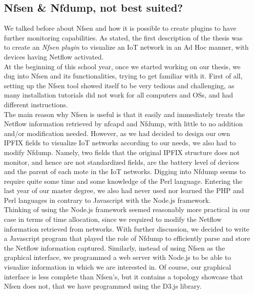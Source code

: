 \subsection{Nfsen \& Nfdump, not best suited?}

We talked before about Nfsen and how it is possible to create plugins to have further monitoring capabilities. As stated, the first description of the thesis was to create an \textit{Nfsen plugin} to visualize an IoT network in an Ad Hoc manner, with devices having Netflow activated.\\

At the beginning of this school year, once we started working on our thesis, we dug into Nfsen and its functionalities, trying to get familiar with it. First of all, setting up the Nfsen tool showed itself to be very tedious and challenging, as many installation tutorials did not work for all computers and OSs, and had different instructions.\\

The main reason why Nfsen is useful is that it easily and immediately treats the Netflow information retrieved by nfcapd and Nfdump, with little to no addition and/or modification needed. However, as we had decided to design our own IPFIX fields to visualize IoT networks according to our needs, we also had to modify Nfdump. Namely, two fields that the original IPFIX structure does not monitor, and hence are not standardized fields, are the battery level of devices and the parent of each mote in the IoT networks. Digging into Nfdump seems to require quite some time and some knowledge of the Perl language. Entering the last year of our master degree, we also had never used nor learned the PHP and Perl languages in contrary to Javascript with the Node.js framework. \\

Thinking of using the Node.js framework seemed reasonably more practical in our case in terms of time allocation, since we required to modify the Netflow information retrieved from networks. With further discussion, we decided to write a Javascript program that played the role of Nfdump to efficiently parse and store the Netflow information captured. Similarly, instead of using Nfsen as the graphical interface, we programmed a web server with Node.js to be able to visualize information in which we are interested in. Of course, our graphical interface is less complete than Nfsen's, but it contains a topology showcase that Nfsen does not, that we have programmed using the D3.js library.\\


